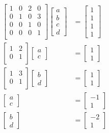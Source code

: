 \documentclass{article}
\begin{document}
\begin{align*}
  \begin{bmatrix}
    1 & 0 & 2 & 0 \\
    0 & 1 & 0 & 3 \\
    0 & 0 & 1 & 0 \\
    0 & 0 & 0 & 1 \\
  \end{bmatrix}
  \begin{bmatrix}
    a \\ b \\ c \\ d
  \end{bmatrix}
  &=
  \begin{bmatrix}
    1 \\ 1 \\ 1 \\ 1
  \end{bmatrix}
  \\
  \begin{bmatrix}
    1 & 2 \\
    0 & 1 \\
  \end{bmatrix}
  \begin{bmatrix}
    a \\ c
  \end{bmatrix}
  &=
  \begin{bmatrix}
    1 \\ 1
  \end{bmatrix}
  \\
  \begin{bmatrix}
    1 & 3 \\
    0 & 1 \\
  \end{bmatrix}
  \begin{bmatrix}
    b \\ d
  \end{bmatrix}
  &=
  \begin{bmatrix}
    1 \\ 1
  \end{bmatrix}
  \\
  \begin{bmatrix}
    a \\ c
  \end{bmatrix}
  &=
  \begin{bmatrix}
    -1 \\ 1
  \end{bmatrix}
  \\
  \begin{bmatrix}
    b \\ d
  \end{bmatrix}
  &=
  \begin{bmatrix}
    -2 \\ 1
  \end{bmatrix}
\end{align*}
\end{document}
